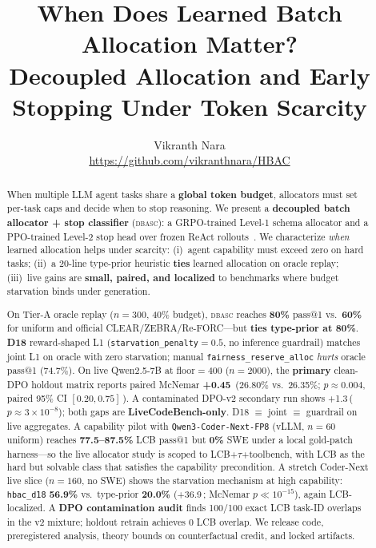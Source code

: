 \documentclass[11pt,letterpaper]{article}
\title{When Does Learned Batch Allocation Matter?\\Decoupled Allocation and Early Stopping Under Token Scarcity}
\author{
  Vikranth Nara\\
  \url{https://github.com/vikranthnara/HBAC}
}
\date{}
\makeatletter
\newcommand{\dbasc}{\textsc{dbasc}}
\newcommand{\passat}[1]{pass@#1}
\newcommand{\pp}{\,\text{pp}}
\makeatother
\begin{document}
\maketitle

\begin{abstract}
When multiple LLM agent tasks share a \textbf{global token budget}, allocators must set per-task caps and decide when to stop reasoning.
We present a \textbf{decoupled batch allocator + stop classifier} (\dbasc{}): a GRPO-trained Level-1 schema allocator and a PPO-trained Level-2 stop head over frozen ReAct rollouts~\citep{yao2023react}.
We characterize \emph{when} learned allocation helps under scarcity: (i)~agent capability must exceed zero on hard tasks; (ii)~a 20-line type-prior heuristic \textbf{ties} learned allocation on oracle replay; (iii)~live gains are \textbf{small, paired, and localized} to benchmarks where budget starvation binds under generation.

On Tier-A oracle replay ($n{=}300$, 40\% budget), \dbasc{} reaches \textbf{80\%} \passat{1} vs.\ \textbf{60\%} for uniform and official CLEAR/ZEBRA/Re-FORC---but \textbf{ties type-prior at 80\%}.
\textbf{D18} reward-shaped L1 (\texttt{starvation\_penalty}${=}0.5$, no inference guardrail) matches joint L1 on oracle with zero starvation; manual \texttt{fairness\_reserve\_alloc} \emph{hurts} oracle \passat{1} (74.7\%).
On live Qwen2.5-7B at floor${=}400$ ($n{=}2000$), the \textbf{primary} clean-DPO holdout matrix reports paired McNemar \textbf{+0.45\pp} (26.80\% vs.\ 26.35\%; $p{\approx}0.004$, paired 95\% CI $[0.20,0.75]$\pp).
A contaminated DPO-v2 secondary run shows +1.3\pp ($p{\approx}3{\times}10^{-8}$); both gaps are \textbf{LiveCodeBench-only}.
D18 $\equiv$ joint $\equiv$ guardrail on live aggregates.
A capability pilot with \texttt{Qwen3-Coder-Next-FP8} (vLLM, $n{=}60$ uniform) reaches \textbf{77.5--87.5\%} LCB \passat{1} but \textbf{0\%} SWE under a local gold-patch harness---so the live allocator study is scoped to LCB+$\tau$+toolbench, with LCB as the hard but solvable class that satisfies the capability precondition.
A stretch Coder-Next live slice ($n{=}160$, no SWE) shows the starvation mechanism at high capability: \texttt{hbac\_d18} \textbf{56.9\%} vs.\ type-prior \textbf{20.0\%} (+36.9\pp; McNemar $p{\ll}10^{-15}$), again LCB-localized.
A \textbf{DPO contamination audit} finds 100/100 exact LCB task-ID overlaps in the v2 mixture; holdout retrain achieves 0 LCB overlap.
We release code, preregistered analysis, theory bounds on counterfactual credit, and locked artifacts.
\end{abstract}
\end{document}
